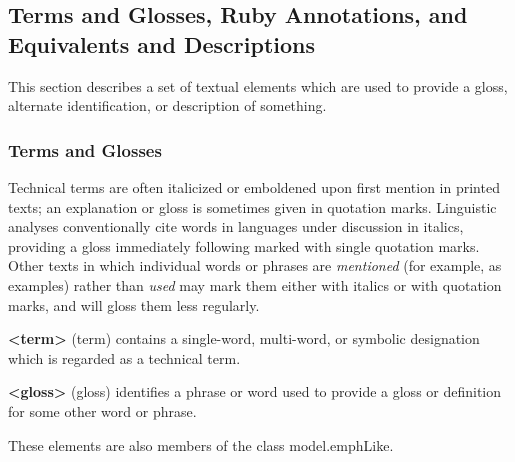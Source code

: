 \subsection[{Terms and Glosses, Ruby Annotations, and Equivalents and Descriptions}]{Terms and Glosses, Ruby Annotations, and Equivalents and Descriptions}\label{COHTGEDR}\par
This section describes a set of textual elements which are used to provide a gloss, alternate identification, or description of something.
\subsubsection[{Terms and Glosses}]{Terms and Glosses}\label{COHTG}\par
Technical terms are often italicized or emboldened upon first mention in printed texts; an explanation or gloss is sometimes given in quotation marks. Linguistic analyses conventionally cite words in languages under discussion in italics, providing a gloss immediately following marked with single quotation marks. Other texts in which individual words or phrases are \textit{mentioned} (for example, as examples) rather than \textit{used} may mark them either with italics or with quotation marks, and will gloss them less regularly.
\begin{sansreflist}
  
\item [\textbf{<term>}] (term) contains a single-word, multi-word, or symbolic designation which is regarded as a technical term.
\item [\textbf{<gloss>}] (gloss) identifies a phrase or word used to provide a gloss or definition for some other word or phrase.
\end{sansreflist}
 These elements are also members of the class \textsf{model.emphLike}.\par
